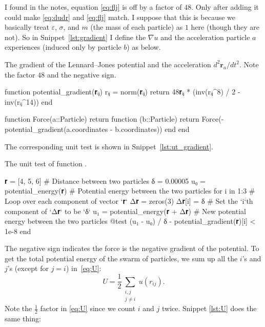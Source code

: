 %
I found in the notes, equation \eqref{eq:flj} is off by a factor of $48$.
Only after adding it could make \eqref{eq:dudr} and \eqref{eq:flj} match.
I suppose that this is because we basically treat
$\varepsilon$, $\sigma$, and $m$ (the mass of each particle) as $1$ here (though they
are not). So in Snippet~\ref{lst:gradient} I define the $\nabla u$ and the acceleration
particle $a$ experiences (induced only by particle $b$) as below.
%
\begin{algorithm}
    \caption{The gradient of the Lennard--Jones potential and the acceleration
        $d^2 \bm{r}_a / d t^2$. Note the factor $48$ and the negative sign.}
    \label{lst:gradient}
    \begin{juliacode}
        function potential_gradient(𝐫ᵢⱼ)
            rᵢⱼ = norm(𝐫ᵢⱼ)
            return 48𝐫ᵢⱼ * (inv(rᵢⱼ^8) / 2 - inv(rᵢⱼ^14))
        end

        function Force(a::Particle)
            return function (b::Particle)
                return Force(-potential_gradient(a.coordinates - b.coordinates))
            end
        end
    \end{juliacode}
\end{algorithm}
%
The corresponding unit test is shown in Snippet~\ref{lst:ut_gradient}.
%
\begin{algorithm}
    \caption{The unit test of function .}
    \label{lst:ut_gradient}
    \begin{juliacode}
        𝐫 = [4, 5, 6]  # Distance between two particles
        δ = 0.00005
        u₀ = potential_energy(𝐫)  # Potential energy between the two particles
        for i in 1:3  # Loop over each component of vector `𝐫`
            Δ𝐫 = zeros(3)
            Δ𝐫[i] = δ  # Set the `i`th component of `Δ𝐫` to be `δ`
            u₁ = potential_energy(𝐫 + Δ𝐫)  # New potential energy between the two particles
            @test (u₁ - u₀) / δ - potential_gradient(𝐫)[i] < 1e-8
        end
    \end{juliacode}
\end{algorithm}
%
The negative sign indicates the force is the negative gradient of the potential.
To get the total potential energy of the swarm of particles, we sum up all the $i$'s
and $j$'s (except for $j = i$) in~\eqref{eq:U}:
%
\begin{equation}\label{eq:U}
    U = \frac{ 1 }{ 2 }\sum_{\substack{i, j\\ j \neq i}} u(r_{ij}).
\end{equation}
%
Note the $\frac{ 1 }{ 2 }$ factor in \eqref{eq:U} since we count $i$ and $j$ twice.
Snippet \ref{lst:U} does the same thing:

